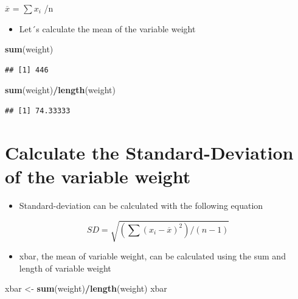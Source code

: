 \documentclass[
]{book}
\newenvironment{Shaded}{\begin{snugshade}}{\end{snugshade}}
\newcommand{\FunctionTok}[1]{\textcolor[rgb]{0.13,0.29,0.53}{\textbf{#1}}}
\newcommand{\NormalTok}[1]{#1}
\newcommand{\OtherTok}[1]{\textcolor[rgb]{0.56,0.35,0.01}{#1}}
\newcommand{\SpecialCharTok}[1]{\textcolor[rgb]{0.81,0.36,0.00}{\textbf{#1}}}
\providecommand{\tightlist}{%
  \setlength{\itemsep}{0pt}\setlength{\parskip}{0pt}}
\begin{document}
\(\overline{x}\) = \(\sum x_i\) /n

\begin{itemize}
\tightlist
\item
  Let´s calculate the mean of the variable weight
\end{itemize}

\begin{Shaded}
\begin{Highlighting}[]
\FunctionTok{sum}\NormalTok{(weight)}
\end{Highlighting}
\end{Shaded}

\begin{verbatim}
## [1] 446
\end{verbatim}

\begin{Shaded}
\begin{Highlighting}[]
\FunctionTok{sum}\NormalTok{(weight)}\SpecialCharTok{/}\FunctionTok{length}\NormalTok{(weight)}
\end{Highlighting}
\end{Shaded}

\begin{verbatim}
## [1] 74.33333
\end{verbatim}

\section{Calculate the Standard-Deviation of the variable weight}\label{calculate-the-standard-deviation-of-the-variable-weight}

\begin{itemize}
\tightlist
\item
  Standard-deviation can be calculated with the following equation
\end{itemize}

\[ SD = \sqrt{(\sum (x_i - \overline{x})^2)/(n-1)}\]

\begin{itemize}
\tightlist
\item
  xbar, the mean of variable weight, can be calculated using the sum and length of variable weight
\end{itemize}

\begin{Shaded}
\begin{Highlighting}[]
\NormalTok{xbar }\OtherTok{\textless{}{-}} \FunctionTok{sum}\NormalTok{(weight)}\SpecialCharTok{/}\FunctionTok{length}\NormalTok{(weight)}
\NormalTok{xbar}
\end{Highlighting}
\end{Shaded}
\end{document}
